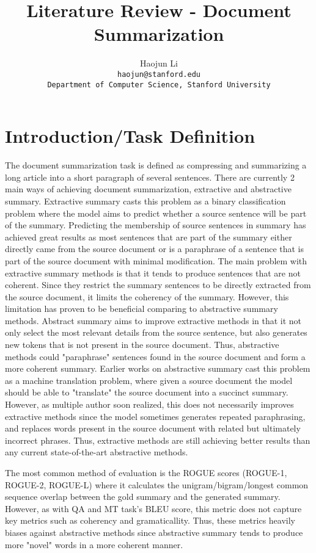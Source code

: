 \documentclass[11pt,a4paper]{article}
\title{Literature Review - Document Summarization}
\author{Haojun Li \\
  \texttt{haojun@stanford.edu}\\
  \texttt{Department of Computer Science, Stanford University}
}
\date{}
\begin{document}
\maketitle
\section{Introduction/Task Definition}
The document summarization task is defined as compressing and summarizing a long article into a short paragraph of several sentences. There are currently 2 main ways of achieving document summarization, extractive and abstractive summary. Extractive summary casts this problem as a binary classification problem where the model aims to predict whether a source sentence will be part of the summary. Predicting the membership of source sentences in summary has achieved great results as most sentences that are part of the summary either directly came from the source document or is a paraphrase of a sentence that is part of the source document with minimal modification. The main problem with extractive summary methods is that it tends to produce sentences that are not coherent. Since they restrict the summary sentences to be directly extracted from the source document, it limits the coherency of the summary. However, this limitation has proven to be beneficial comparing to abstractive summary methods. Abstract summary aims to improve extractive methods in that it not only select the most relevant details from the source sentence, but also generates new tokens that is not present in the source document. Thus, abstractive methods could "paraphrase" sentences found in the source document and form a more coherent summary. Earlier works on abstractive summary cast this problem as a machine translation problem, where given a source document the model should be able to "translate" the source document into a succinct summary. However, as multiple author soon realized, this does not necessarily improves extractive methods since the model sometimes generates repeated paraphrasing, and replaces words present in the source document with related but ultimately incorrect phrases. Thus, extractive methods are still achieving better results than any current state-of-the-art abstractive methods. 

The most common method of evaluation is the ROGUE scores (ROGUE-1, ROGUE-2, ROGUE-L) where it calculates the unigram/bigram/longest common sequence overlap between the gold summary and the generated summary. However, as with QA and MT task's BLEU score, this metric does not capture key metrics such as coherency and gramaticallity. Thus, these metrics heavily biases against abstractive methods since abstractive summary tends to produce more "novel" words in a more coherent manner.
\end{document}
